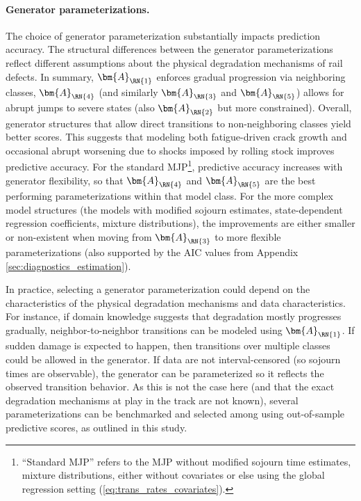 \paragraph{Generator parameterizations.}
The choice of generator parameterization substantially impacts prediction accuracy. 
The structural differences between the generator parameterizations reflect different assumptions about the physical degradation mechanisms of rail defects.
In summary, $\bm{A}_{\RN{1}}$ enforces gradual progression via neighboring classes, $\bm{A}_{\RN{4}}$ (and similarly $\bm{A}_{\RN{3}}$ and $\bm{A}_{\RN{5}}$) allows for abrupt jumps to severe states (also $\bm{A}_{\RN{2}}$ but more constrained). 
Overall, generator structures that allow direct transitions to non-neighboring classes yield better scores. This suggests that modeling both fatigue-driven crack growth and occasional abrupt worsening due to shocks imposed by rolling stock improves predictive accuracy.
For the standard MJP\footnote{``Standard MJP'' refers to the MJP without modified sojourn time estimates, mixture distributions, either without covariates or else using the global regression setting (\cref{eq:trans_rates_covariates}).}, predictive accuracy increases with generator flexibility, so that $\bm{A}_{\RN{4}}$ and $\bm{A}_{\RN{5}}$ are the best performing parameterizations within that model class. For the more complex model structures (the models with modified sojourn estimates, state-dependent regression coefficients, mixture distributions), the improvements are either smaller or non-existent when moving from $\bm{A}_{\RN{3}}$ to more flexible parameterizations (also supported by the AIC values from Appendix \ref{sec:diagnostics_estimation}).

In practice, selecting a generator parameterization could depend on the characteristics of the physical degradation mechanisms and data characteristics. For instance, if domain knowledge suggests that degradation mostly progresses gradually, neighbor-to-neighbor transitions can be modeled using $\bm{A}_{\RN{1}}$. If sudden damage is expected to happen, then transitions over multiple classes could be allowed in the generator.
If data are not interval-censored (so sojourn times are observable), the generator can be parameterized so it reflects the observed transition behavior. As this is not the case here (and that the exact degradation mechanisms at play in the track are not known), several parameterizations can be benchmarked and selected among using out-of-sample predictive scores, as outlined in this study.

